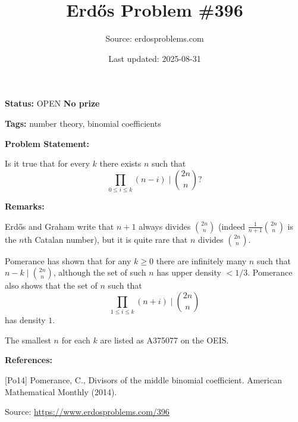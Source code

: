 \documentclass{article}
\title{Erd\H{o}s Problem \#396}
\date{Last updated: 2025-08-31}
\author{Source: erdosproblems.com}
\begin{document}
\maketitle

\noindent\textbf{Status:} OPEN \quad \textbf{No prize}

\noindent\textbf{Tags:} number theory, binomial coefficients

\medskip
\noindent\textbf{Problem Statement:}

Is it true that for every $k$ there exists $n$ such that\[\prod_{0\leq i\leq k}(n-i) \mid \binom{2n}{n}?\]

\bigskip
\noindent\textbf{Remarks:}

Erd\H{o}s and Graham write that $n+1$ always divides $\binom{2n}{n}$ (indeed $\frac{1}{n+1}\binom{2n}{n}$ is the $n$th Catalan number), but it is quite rare that $n$ divides $\binom{2n}{n}$. 

Pomerance \cite{Po14} has shown that for any $k\geq 0$ there are infinitely many $n$ such that $n-k\mid\binom{2n}{n}$, although the set of such $n$ has upper density $<1/3$. Pomerance also shows that the set of $n$ such that\[\prod_{1\leq i\leq k}(n+i)\mid \binom{2n}{n}\]has density $1$.

The smallest $n$ for each $k$ are listed as A375077 on the OEIS.

\bigskip
\noindent\textbf{References:}

[Po14] Pomerance, C., Divisors of the middle binomial coefficient. American Mathematical Monthly (2014).

\bigskip
\noindent\small{Source: \url{https://www.erdosproblems.com/396}}
\end{document}
